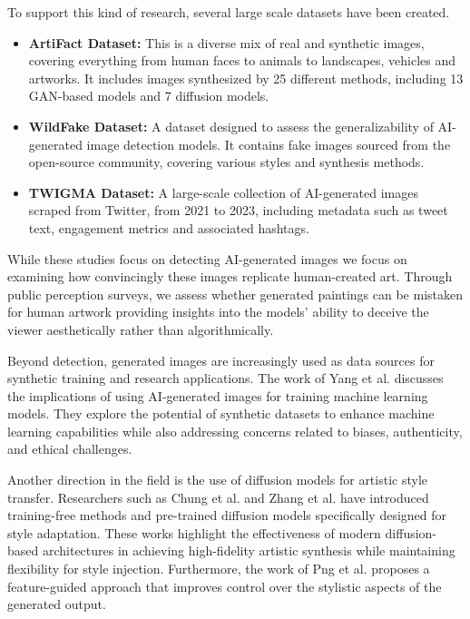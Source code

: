 \documentclass[sn-mathphys]{sn-jnl}
\begin{document}
To support this kind of research, several large scale datasets have been created.
\begin{itemize}
    \item \textbf{ArtiFact Dataset:}\cite{artifact_dataset} This is a diverse mix of real and synthetic images, covering everything from human faces to animals to landscapes, vehicles and artworks. It includes images synthesized by 25 different methods, including 13 GAN-based models and 7 diffusion models.
    \item \textbf{WildFake Dataset:}\cite{wildfake_dataset} A dataset designed to assess the generalizability of AI-generated image detection models. It contains fake images sourced from the open-source community, covering various styles and synthesis methods.
    \item \textbf{TWIGMA Dataset:}\cite{twigma_dataset} A large-scale collection of AI-generated images scraped from Twitter, from 2021 to 2023, including metadata such as tweet text, engagement metrics and associated hashtags.
\end{itemize}
While these studies focus on detecting AI-generated images we focus on examining how convincingly these images replicate human-created art. Through public perception surveys, we assess whether generated paintings can be mistaken for human artwork providing insights into the models' ability to deceive the viewer aesthetically rather than algorithmically. 

Beyond detection, generated images are increasingly used as data sources for synthetic training and research applications. The work of Yang et al. \cite{aigen}
discusses the implications of using AI-generated images for training machine learning models. They explore the potential of synthetic datasets to enhance machine learning capabilities while also addressing concerns related to biases, authenticity, and ethical challenges.

Another direction in the field is the use of diffusion models for artistic style transfer. Researchers such as Chung et al. \cite{Style_injection} and Zhang et al. \cite{Step-aware} \cite{ArtBank} have introduced training-free methods and pre-trained diffusion models specifically designed for style adaptation. These works highlight the effectiveness of modern diffusion-based architectures in achieving high-fidelity artistic synthesis while maintaining flexibility for style injection. Furthermore, the work of Png et al. \cite{FeaST} proposes a feature-guided approach that improves control over the stylistic aspects of the generated output. 
\end{document}
